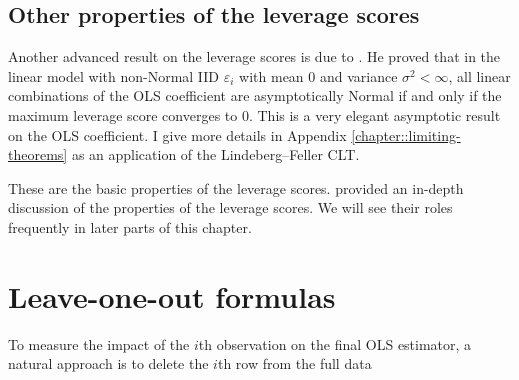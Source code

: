 \subsection{Other properties of the leverage scores}


Another advanced result on the leverage scores is due to 
\citet{huber1973robust}. He proved that in the linear model with non-Normal IID $\varepsilon_i$ with mean $0$ and variance $\sigma^2 < \infty$, all linear combinations of the OLS coefficient are asymptotically Normal if and only if the maximum leverage score converges to $0$. This is a very elegant asymptotic result on the OLS coefficient. I give more details in Appendix \ref{chapter::limiting-theorems} as an application of the Lindeberg--Feller CLT.  


 These are the basic properties of the leverage scores. 
\citet{chatterjee1988sensitivity} provided an in-depth discussion of the properties of the leverage scores. 
We will see their roles frequently in later parts of this chapter.




\section{Leave-one-out formulas}

To measure the impact of the $i$th observation on the final OLS estimator,
a natural approach is to delete the $i$th row from the full data

